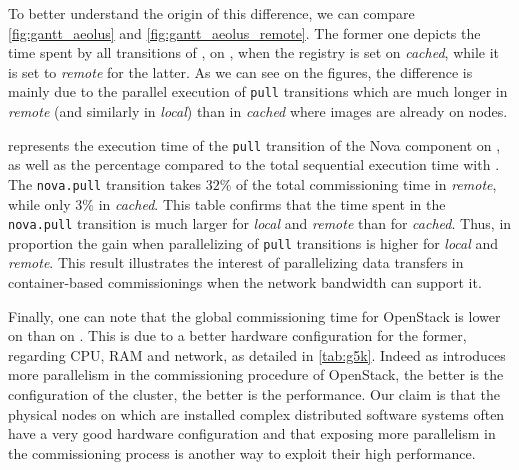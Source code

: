 To better understand the origin of this difference, we can compare
\cref{fig:gantt_aeolus} and \cref{fig:gantt_aeolus_remote}. The former
one depicts the time spent by all transitions of \aeoass, on \ecotype,
when the \docker registry is set on \emph{cached}, while it is set to
\emph{remote} for the latter. As we can see on the figures, the
difference is mainly due to the parallel execution of \texttt{pull}
transitions which are much longer in \emph{remote} (and similarly in
\emph{local}) than in \emph{cached} where images are already on nodes.

 represents the execution time of the \texttt{pull}
transition of the Nova component on \ecotype, as well as the
percentage compared to the total sequential execution time with
\ansass. The \texttt{nova.pull} transition takes $32\%$ of the total
commissioning time in \emph{remote}, while only $3\%$ in
\emph{cached}. This table confirms that the time spent in the
\texttt{nova.pull} transition is much larger for \emph{local} and
\emph{remote} than for \emph{cached}. Thus, in proportion the gain
when parallelizing of \texttt{pull} transitions is higher for
\emph{local} and \emph{remote}. This result illustrates the interest
of parallelizing data transfers in container-based commissionings when
the network bandwidth can support it.

Finally, one can note that the global commissioning time for OpenStack
is lower on \ecotype than on \nova. This is due to a better hardware
configuration for the former, regarding CPU, RAM and network, as
detailed in \cref{tab:g5k}. Indeed as \mad introduces more parallelism
in the commissioning procedure of OpenStack, the better is the
configuration of the cluster, the better is the performance. Our claim
is that the physical nodes on which are installed complex distributed
software systems often have a very good hardware configuration and
that exposing more parallelism in the commissioning process is another
way to exploit their high performance.




